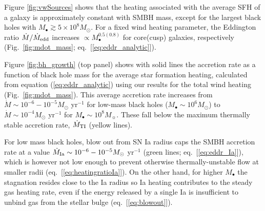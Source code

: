 \documentclass[usenatbib,fleqn]{mn2e}
\begin{document}
Figure \ref{fig:vwSources} shows that the heating associated with the
average SFH of a galaxy is approximately constant
with SMBH mass, except for the largest black holes with $M_{\bullet}
\gtrsim 5\times 10^{8}M_{\odot}$.  For a fixed wind heating parameter,
the Eddington ratio $\dot{M}/\dot{M}_{\rm edd}$ increases $\propto
M_{\bullet}^{0.5(0.8)}$ for core(cusp) galaxies, respectively
(Fig.~\ref{fig:mdot_mass}; eq.~[\ref{eq:eddr_analytic}]).

Figure \ref{fig:bh_growth} (top panel) shows with solid lines the
accretion rate as a function of black hole mass for the average star
formation heating, calculated from equation (\ref{eq:eddr_analytic})
using our results for the total wind heating
(Fig.~\ref{fig:mdot_mass}).  This average accretion rate increases
from $\dot{M} \sim 10^{-6}-10^{-5}M_{\odot}$ yr$^{-1}$ for low-mass
black holes ($M_{\bullet} \sim 10^{6}M_{\odot}$) to $\dot{M} \sim
10^{-4}M_{\odot}$ yr$^{-1}$ for $M_{\bullet} \sim 10^{8}M_{\sun}$.
These fall below the maximum thermally stable accretion rate,
$\dot{M}_{\rm TI}$ (yellow lines).


For low mass black holes, blow out from SN Ia radius caps the SMBH
accretion rate at a value $\dot{M}_{\rm Ia} \sim
10^{-6}-10^{-5}M_{\odot}$ yr$^{-1}$ (green lines;
eq.~[\ref{eq:eddr_Ia}]), which is however not low enough to prevent
otherwise thermally-unstable flow at smaller radii (eq.~[\ref{eq:heatingratioIa}]).  On the other hand, for higher
$M_{\bullet}$ the stagnation resides close to the Ia radius so Ia
heating contributes to the steady gas heating rate, even if the energy
released by a single Ia is insufficient to unbind gas from the stellar
bulge (eq.~[\ref{eq:blowout}]).

\end{document}
